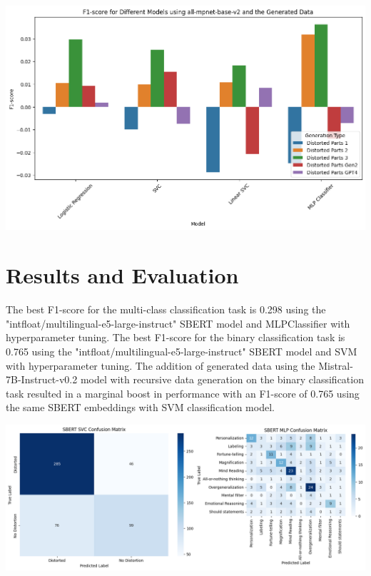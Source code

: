 \documentclass[a0,landscape]{a0poster}
\begin{document}
\begin{multicols}{4}
\begin{center}
\includegraphics[width=0.99\linewidth]{figures/generatedDataDiffDiff.png}
\end{center}\vspace{1cm}


\color{Teal}
\section*{Results and Evaluation}
\color{Black}

The best F1-score for the multi-class classification task is 0.298 using the "intfloat/multilingual-e5-large-instruct" SBERT model and MLPClassifier with hyperparameter tuning. 
The best F1-score for the binary classification task is 0.765 using the "intfloat/multilingual-e5-large-instruct" SBERT model and SVM with hyperparameter tuning. 
The addition of generated data using the Mistral-7B-Instruct-v0.2 model with recursive data generation on the binary classification task resulted in a 
marginal boost in performance with an F1-score of 0.765 using the same SBERT embeddings with SVM classification model.

\begin{center}
\includegraphics[width=0.99\linewidth]{figures/finalGraphs.png}
\end{center}\vspace{1cm}


\end{multicols}
\end{document}
